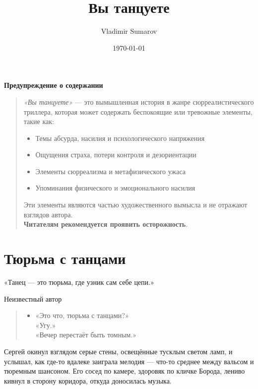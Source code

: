\documentclass[12pt,a4paper]{book}
\title{Вы танцуете} %
\author{Vladimir Sumarov} %
\date{\today}
\newenvironment{dialogue}{\begin{quote}\itshape\begin{itemize}\item[]}{\end{itemize}\end{quote}}
\begin{document}
\maketitle
\clearpage %
\begin{center}
    \vspace*{2cm}
    {\Large \textbf{Предупреждение о содержании}} \\
    \vspace{1cm}
\end{center}

\begin{quote}
\textit{«Вы танцуете»} --- это вымышленная история в жанре сюрреалистического триллера, которая может содержать беспокоящие или тревожные элементы, такие как:
\begin{itemize}
    \item Темы абсурда, насилия и психологического напряжения
    \item Ощущения страха, потери контроля и дезориентации
    \item Элементы сюрреализма и метафизического ужаса
    \item Упоминания физического и эмоционального насилия
\end{itemize}

Эти элементы являются частью художественного вымысла и не отражают взглядов автора. \\
\textbf{Читателям рекомендуется проявить осторожность}.
\end{quote}

\clearpage %
\tableofcontents
\clearpage

\chapter{Тюрьма с танцами}
\epigraph{«Танец --- это тюрьма, где узник сам себе цепи.»}{Неизвестный автор}

\begin{dialogue}
«Это что, тюрьма с танцами?» \\
«Угу.» \\
«Вечер перестаёт быть томным.»
\end{dialogue}

Сергей окинул взглядом серые стены, освещённые тусклым светом ламп, и услышал, как где-то вдалеке заиграла мелодия --- что-то среднее между вальсом и тюремным шансоном. Его сосед по камере, здоровяк по кличке Борода, лениво кивнул в сторону коридора, откуда доносилась музыка.
\end{document}

